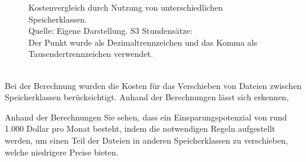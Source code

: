 {\begin{figure}[h!]
  \caption[Kostenvergleich durch Nutzung von unterschiedlichen Speicherklassen]{}\label{fig:Kostenvergleich_Nutzung_unt_Speicherklassen} 
  Kostenvergleich durch Nutzung von unterschiedlichen Speicherklassen.  \\
  Quelle: Eigene Darstellung. S3 Stundensätze: {\cite{AMZ09}}\\
Der Punkt wurde als Dezimaltrennzeichen und das Komma als Tausendertrennzeichen verwendet.
\end{figure}
\\
Bei der Berechnung wurden die Kosten für das Verschieben von Dateien zwischen Speicherklassen berücksichtigt. 
Anhand der Berechnungen lässt sich erkennen, 

Anhand der Berechnungen  Sie sehen, dass ein Einsparungspotenzial von rund 1.000 Dollar pro Monat besteht, indem die notwendigen Regeln aufgestellt werden, um einen Teil der Dateien in anderen Speicherklassen zu verschieben, welche niedrigere Preise bieten.

}
